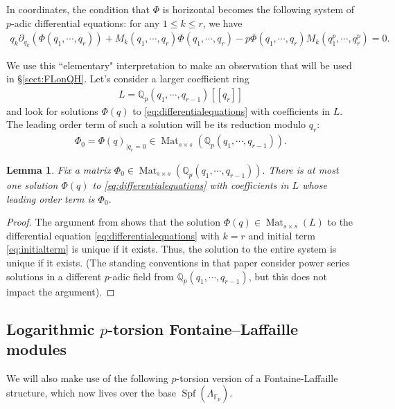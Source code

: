 \documentclass[reqno]{amsart}
\numberwithin{equation}{section}
\numberwithin{equation}{section}
\numberwithin{equation}{section}
\newtheorem{lemma}[thm]{Lemma}
\theoremstyle{definition}
\theoremstyle{remark}
\theoremstyle{remark}
\begin{document}
In coordinates, the condition that $\Phi$ is horizontal becomes the following system of $p$-adic differential equations: for any $1 \leq k \leq r$, we have
\begin{align} \label{eq:differentialequations} q_k\partial_{q_k}(\Phi(q_1, \cdots, q_r)) + M_k(q_1, \cdots, q_r)\Phi(q_1, \cdots, q_r)-p\Phi(q_1, \cdots, q_r)M_k(q_1^p, \cdots, q_r^p)=0. \end{align}

We use this ``elementary" interpretation to make an observation that will be used in \S \ref{sect:FLonQH}.  Let's consider a larger coefficient ring  \begin{align} \label{eq:largerring} L= \mathbb{Q}_p(q_1,\cdots,q_{r-1})[[q_r]]  \end{align} 
and look for solutions $\Phi(q)$ to \eqref{eq:differentialequations} with coefficients in $L$. The leading order term of such a solution will be its reduction modulo $q_r$: \begin{align} \label{eq:initialterm} \Phi_0 = \Phi(q)_{|{q_r}=0} \in \operatorname{Mat}_{s\times s}(\mathbb{Q}_p(q_1,\cdots,q_{r-1})). \end{align}
\begin{lemma} \label{lem:initialtermdeterminesFrob} Fix a matrix $\Phi_0 \in \operatorname{Mat}_{s\times s}(\mathbb{Q}_p(q_1,\cdots,q_{r-1})).$ There is at most one solution $\Phi(q)$ to  \eqref{eq:differentialequations} with coefficients in $L$ whose leading order term is $\Phi_0.$ \end{lemma}
\begin{proof} The argument from \cite[Lemma 3.4(i)]{bai2025p} shows that the solution $\Phi(q) \in \operatorname{Mat}_{s\times s}(L)$ to the differential equation \eqref{eq:differentialequations} with $k=r$ and initial term \eqref{eq:initialterm} is unique if it exists. Thus, the solution to the entire system is unique if it exists. (The standing conventions in that paper consider power series solutions in a different $p$-adic field from $\mathbb{Q}_p(q_1,\cdots,q_{r-1})$, but this does not impact the argument). \end{proof}

\subsection{Logarithmic $p$-torsion Fontaine--Laffaille modules}\label{ssec:ptorsion-FL}
We will also make use of the following $p$-torsion version of a Fontaine-Laffaille structure, which now lives over the base $\operatorname{Spf}(\Lambda_{\mathbb{F}_p}).$ 
\end{document}
